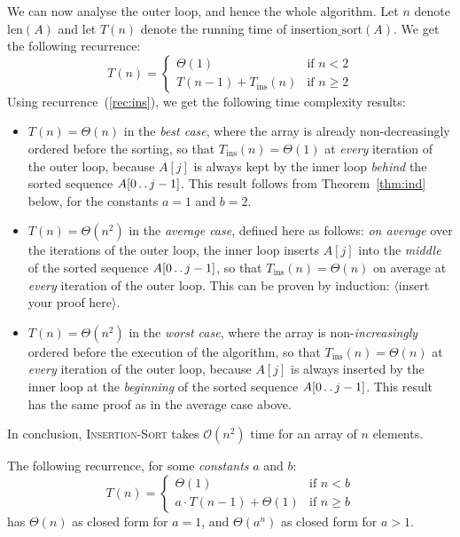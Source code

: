 \documentclass[a4paper,11pt]{article}
\newcommand{\length}[1]{\text{len}(#1)}
\newcommand{\twodots}{\mathinner{\ldotp\ldotp}}  %
\newcommand{\Oh}[1]{\mathcal{O}\left(#1\right)}
\begin{document}
We can now analyse the outer loop, and hence the whole algorithm.  Let
$n$ denote $\length{A}$ and let $T(n)$ denote the running time of
$\text{insertion\_sort}(A)$.  We get the following recurrence:
\begin{equation*}
  T(n) =
  \begin{cases}
    \Theta(1) & \text{if~} n < 2 \\
    T(n-1) + T_{\text{ins}}(n) & \text{if~} n \geq 2
  \end{cases}
\end{equation*}
Using recurrence~(\ref{rec:ins}), we get the following time complexity
results:
\begin{itemize}
\item $T(n) = \Theta(n)$ in the \emph{best case}, where the array is
  already non-decreasingly ordered before the sorting, so that
  $T_{\text{ins}}(n) = \Theta(1)$ at \emph{every} iteration of the
  outer loop, because $A[j]$ is always kept by the inner loop
  \emph{behind} the sorted sequence $A[0 \twodots j-1]$.  This result
  follows from Theorem~\ref{thm:ind} below, for the constants $a=1$
  and $b=2$.
\item $T(n) = \Theta(n^2)$ in the \emph{average case}, defined here as
  follows: \emph{on average} over the iterations of the outer loop,
  the inner loop inserts $A[j]$ into the \emph{middle} of the sorted
  sequence $A[0 \twodots j-1]$, so that $T_{\text{ins}}(n) =
  \Theta(n)$ on average at \emph{every} iteration of the outer loop.
  This can be proven by induction: $\langle$insert your proof
  here$\rangle$.
\item $T(n) = \Theta(n^2)$ in the \emph{worst case}, where the array
  is non-\emph{increasingly} ordered before the execution of the
  algorithm, so that $T_{\text{ins}}(n) = \Theta(n)$ at \emph{every}
  iteration of the outer loop, because $A[j]$ is always inserted by
  the inner loop at the \emph{beginning} of the sorted sequence $A[0
  \twodots j-1]$.  This result has the same proof as in the average
  case above.
\end{itemize}
In conclusion, \textsc{Insertion-Sort} takes $\Oh{n^2}$ time for an
array of $n$ elements.

\begin{theorem}
  \label{thm:ind}
  The following recurrence, for some \emph{constants} $a$ and $b$:
  \[
  T(n) =
  \begin{cases}
    \Theta(1) & \text{if~} n < b \\
    a \cdot T(n-1) + \Theta(1) & \text{if~} n \geq b
  \end{cases}
  \]
  has $\Theta(n)$ as closed form for $a = 1$, and $\Theta(a^n)$ as
  closed form for $a > 1$.
\end{theorem}
\end{document}
